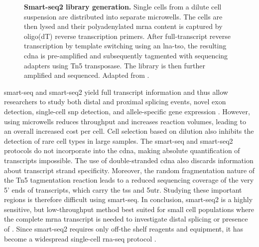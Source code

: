 \begin{figure}
	\centerfloat
	\def\svgwidth{\textwidth}
	
	\caption[Smart-seq2 library generation]{\textbf{Smart-seq2 library generation.} Single cells from a dilute cell suspension are distributed into separate microwells. The cells are then lysed and their polyadenylated \acrshort{mrna} content is captured by oligo(dT) reverse transcription primers. After full-transcript reverse transcription by template switching using an \acrshort{lna}-\acrshort{tso}, the resulting \acrshort{cdna} is pre-amplified and subsequently tagmented with sequencing adapters using Tn5 transposase. The library is then further amplified and sequenced. Adapted from \citealp{picelli2014}.}
	\label{fig:picelli2014_fig1_edited}
\end{figure}

\Acrshort{smart-seq} and \acrshort{smart-seq}2 yield full transcript information and thus allow researchers to study both distal and proximal splicing events, novel exon detection, single-cell \acrshort{snp} detection, and allele-specific gene expression \citep{kolodziejczyk2015}. However, using microwells reduces throughput and increases reaction volumes, leading to an overall increased cost per cell. Cell selection based on dilution also inhibits the detection of rare cell types in large samples. The \acrshort{smart-seq} and \acrshort{smart-seq}2 protocols do not incorporate  into the \acrshort{cdna}, making absolute quantification of transcripts impossible. The use of double-stranded \acrshort{cdna} also discards information about transcript strand specificity. Moreover, the random fragmentation nature of the Tn5 tagmentation reaction leads to a reduced sequencing coverage of the very 5' ends of transcripts, which carry the \acrfull{tss} and \acrfull{5utr}. Studying these important regions is therefore difficult using \acrshort{smart-seq}. In conclusion, \acrshort{smart-seq}2 is a highly sensitive, but low-throughput method best suited for small cell populations where the complete \acrshort{mrna} transcript is needed to investigate distal splicing or presence of . Since \acrshort{smart-seq}2 requires only off-the shelf reagents and equipment, it has become a widespread single-cell \acrshort{rna-seq} protocol \citep{picelli2017}.\pms

\newpage
